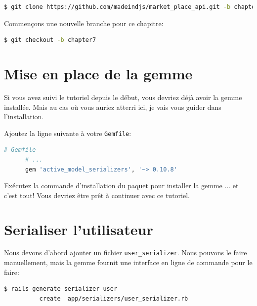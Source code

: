 \documentclass[]{report}
\begin{document}
  \begin{scriptsize}
    \begin{lstlisting}[language=bash]
    $ git clone https://github.com/madeindjs/market_place_api.git -b chapter6
    \end{lstlisting}
  \end{scriptsize}

  Commençons une nouvelle branche pour ce chapitre:

  \begin{scriptsize}
    \begin{lstlisting}[language=bash]
    $ git checkout -b chapter7
    \end{lstlisting}
  \end{scriptsize}

  \section{Mise en place de la gemme}

    Si vous avez suivi le tutoriel depuis le début, vous devriez déjà avoir la gemme installée. Mais au cas où vous auriez atterri ici, je vais vous guider dans l'installation.

    Ajoutez la ligne suivante à votre \verb|Gemfile|:

    \begin{scriptsize}
      \begin{lstlisting}[language=ruby]
      # Gemfile
      # ...
      gem 'active_model_serializers', '~> 0.10.8'
      \end{lstlisting}
    \end{scriptsize}

    Exécutez la commande d'installation du paquet pour installer la gemme ... et c'est tout! Vous devriez être prêt à continuer avec ce tutoriel.

  \section{Serialiser l'utilisateur}\label{sec:serialize_user}

    Nous devons d'abord ajouter un fichier \verb|user_serializer|. Nous pouvons le faire manuellement, mais la gemme fournit une interface en ligne de commande pour le faire:

    \begin{scriptsize}
      \begin{lstlisting}[language=bash]
      $ rails generate serializer user
          create  app/serializers/user_serializer.rb
      \end{lstlisting}
    \end{scriptsize}
\end{document}

